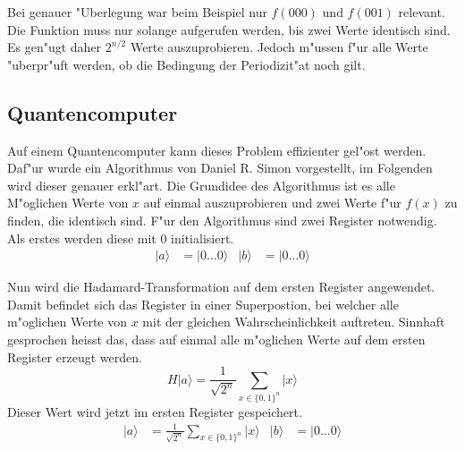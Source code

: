 \begin{refsection}
Bei genauer "Uberlegung war beim Beispiel nur $f(000)$ und $f(001)$ relevant.
Die Funktion muss nur solange aufgerufen werden, bis zwei Werte identisch sind.
Es gen"ugt daher $2^{n/2}$ Werte auszuprobieren.
Jedoch m"ussen f"ur alle Werte "uberpr"uft werden, ob die Bedingung der 
Periodizit"at noch gilt.

\subsection{Quantencomputer}

Auf einem Quantencomputer kann dieses Problem effizienter gel"ost werden.
Daf"ur wurde ein Algorithmus von Daniel R. Simon vorgestellt, im Folgenden wird
dieser genauer erkl"art.
Die Grundidee des Algorithmus ist es alle M"oglichen Werte von $x$ auf einmal
auszuprobieren und zwei Werte f"ur $f(x)$ zu finden, die identisch sind.
F"ur den Algorithmus sind zwei Register notwendig. Als erstes werden diese mit
0 initialisiert.
\begin{align*}
  |a\rangle&=|0 \dots 0 \rangle 
  &
  |b\rangle&=|0 \dots 0 \rangle 
\end{align*}

Nun wird die Hadamard-Transformation auf dem ersten Register angewendet. Damit
befindet sich das Register in einer Superpostion, bei welcher alle m"oglichen
Werte von $x$ mit der gleichen Wahrscheinlichkeit auftreten. Sinnhaft
gesprochen heisst das, dass auf einmal alle m"oglichen Werte auf dem ersten
Register erzeugt werden.
\[ 
    H|a\rangle=\frac{1}{\sqrt{2^n}} \sum_{x\in\{0,1\}^n}{|x\rangle}
\]
Dieser Wert wird jetzt im ersten Register gespeichert.
\begin{align*}
  |a\rangle &= \frac{1}{\sqrt{2^n}} \sum_{x\in\{0,1\}^n} {|x\rangle} &
  |b\rangle&=|0 \dots 0 \rangle 
\end{align*}


\end{refsection}
